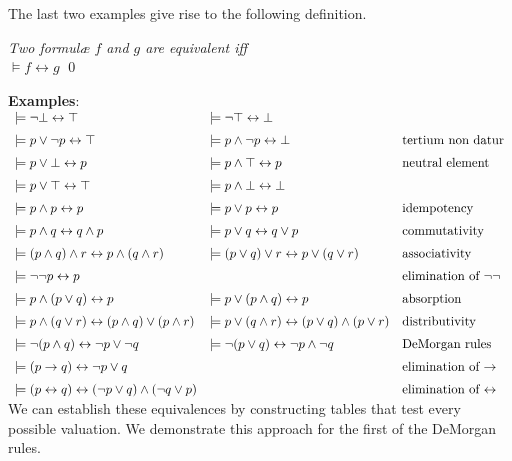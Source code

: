 The last two examples give rise to the following definition.
\begin{Definition}[Equivalent]
{\em
  Two {formul\ae}  $f$ and $g$ are \emph{equivalent} iff \\[0.2cm]
\hspace*{1.3cm} $\models f \leftrightarrow g$ 
} \qed
\end{Definition}

\noindent
\textbf{Examples}:  \\[0.3cm]
\hspace*{0.3cm} 
$\begin{array}{lll}
\models \neg \bot \leftrightarrow \top & \models \neg \top \leftrightarrow \bot &  \\[0.2cm]
 \models p \vee   \neg p \leftrightarrow \top & \models p \wedge \neg p \leftrightarrow
 \bot & \mbox{tertium non datur} \\[0.2cm]
 \models p \vee   \bot \leftrightarrow p & \models p \wedge \top  \leftrightarrow p & \mbox{neutral element}\\[0.2cm]
 \models p \vee   \top  \leftrightarrow \top & \models p \wedge \bot \leftrightarrow \bot &  \\[0.2cm]
 \models p \wedge p \leftrightarrow p  & \models p \vee p \leftrightarrow p &  \mbox{idempotency} \\[0.2cm]
 \models p \wedge q \leftrightarrow q \wedge p & \models p \vee   q \leftrightarrow q \vee p & \mbox{commutativity} \\[0.2cm]
 \models (p \wedge q) \wedge r \leftrightarrow p \wedge (q \wedge r) & \models (p \vee   q) \vee r \leftrightarrow p \vee   (q \vee r)  &
 \mbox{associativity} \\[0.2cm]
 \models \neg \neg p \leftrightarrow p & & \mbox{elimination of $\neg \neg$} \\[0.2cm]
 \models p \wedge (p \vee q)   \leftrightarrow p & \models p \vee   (p \wedge q) \leftrightarrow p &  \mbox{absorption} \\[0.2cm]
 \models p \wedge (q \vee r)   \leftrightarrow (p \wedge q) \vee   (p \wedge r) & 
 \models p \vee   (q \wedge r) \leftrightarrow (p \vee q)   \wedge (p \vee   r) & \mbox{distributivity} \\[0.2cm]
 \models \neg (p \wedge q) \leftrightarrow  \neg p \vee   \neg q &  \models \neg (p \vee   q) \leftrightarrow  \neg p \wedge \neg q &
 \mbox{DeMorgan rules}  \\[0.2cm]
 \models (p \rightarrow q) \leftrightarrow \neg p \vee q & &  \mbox{elimination of $\rightarrow$} \\[0.2cm]
 \models (p \leftrightarrow q) \leftrightarrow (\neg p \vee q) \wedge (\neg q \vee p) & &
 \mbox{elimination of $\leftrightarrow$}
\end{array}$ \\[0.3cm]
We can establish these equivalences by constructing tables that test every possible
valuation.  We demonstrate this approach for the first of the DeMorgan rules.

